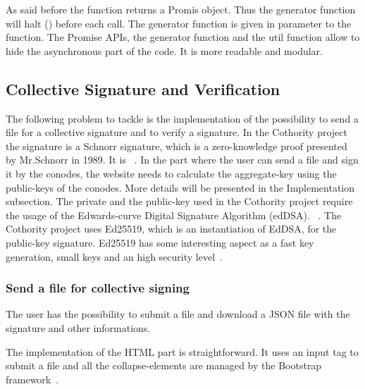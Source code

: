 \documentclass[11pt, a4paper, twoside, openright, openany]{article} %
\begin{document}
As said before the  function returns a Promis object.
Thus the generator function  will halt () before each
 call.
\newline
The generator function is given in parameter to the  function.
\newline
The Promise APIs, the generator function and the util function  allow
to hide the asynchronous part of the code. It is more readable and modular.
\bigbreak


\subsection{Collective Signature and Verification}
The following problem to tackle is the implementation of the possibility to send a
file for a collective signature and to verify a signature.
\newline
In the Cothority project the signature is a Schnorr signature, which is a zero-knowledge proof presented
by Mr.Schnorr in 1989. It is ~\cite{wikiSchnorr}.
\newline
In the part where the user can send a file and sign it by the conodes,
the website needs to calculate the aggregate-key using the public-keys of the conodes.
More details will be presented in the Implementation subsection.
\newline
The private and the public-key used in the Cothority project require the usage of
the Edwards-curve Digital Signature Algorithm (edDSA).
~\cite{edDSA}.
The Cothority project uses Ed25519, which is an instantiation of EdDSA, for the
public-key signature. Ed25519 has some interesting aspect as a fast key generation,
small keys and an high security level~\cite{ed25519}.
\bigbreak

\subsubsection{Send a file for collective signing}
The user has the possibility to submit a file and download a JSON file with the
signature and other informations.

The implementation of the HTML part is straightforward. It uses an input tag to
submit a file and all the collapse-elements are managed by the Bootstrap framework~\cite{bootstrap}.
\bigbreak
\end{document}
